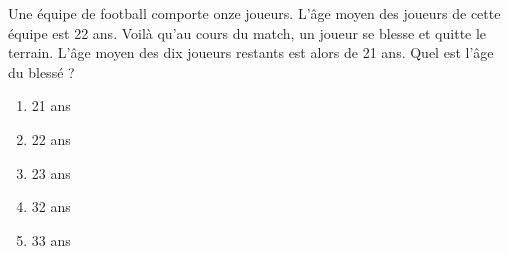 Une équipe de football comporte onze joueurs. L'âge moyen des joueurs de cette équipe est 22 ans. Voilà qu'au cours du match, un joueur se blesse et quitte le terrain. L'âge moyen des dix joueurs restants est alors de 21 ans. Quel est l'âge du blessé ?
\begin{multicols}{5}
  \begin{enumerate}[A/]
  \item 21 ans
  \item 22 ans
  \item 23 ans
  \item 32 ans
  \item 33 ans
  \end{enumerate}
\end{multicols}